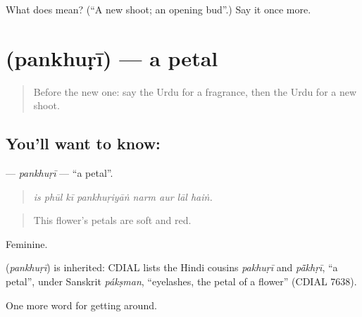 \begin{tcolorbox}[breakable,colback=teal!4,colframe=teal!35!black,title={Before you move on}]
What does  mean? (\textquotedblleft{}A new shoot; an opening bud\textquotedblright{}.) Say it once more.
\end{tcolorbox}
\section[\texorpdfstring{\ur{پنکھڑی} (pankhuṛī)}{پنکھڑی (pankhuṛī)}]{ (pankhuṛī) — a petal}

\label{lesson:UR-C436-pankhuri}



\begin{quote}
Before the new one: say the Urdu for a fragrance, then the Urdu for a new shoot.
\end{quote}

\subsection*{You'll want to know: }
\textbf{} — \emph{pankhuṛī} — \textquotedblleft{}a petal\textquotedblright{}.

\begin{quote}
       
\end{quote}

\begin{quote}
\emph{is phūl kī pankhuṛiyāṅ narm aur lāl haiṅ.}
\end{quote}

\begin{quote}
This flower's petals are soft and red.
\end{quote}

Feminine.

\begin{cousinweb}
\textbf{} (\emph{pankhuṛī}) is inherited: CDIAL lists the Hindi cousins \emph{pakhuṛī} and \emph{pā̃khṛī}, \textquotedblleft{}a petal\textquotedblright{}, under Sanskrit \emph{pákṣman}, \textquotedblleft{}eyelashes, the petal of a flower\textquotedblright{} (CDIAL 7638).
\end{cousinweb}

\begin{grammarlens}[title={What you've built}]
One more word for getting around.
\end{grammarlens}


